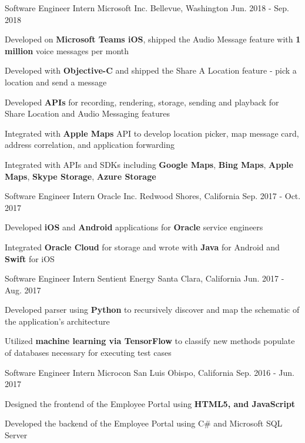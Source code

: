 \begin{cventries}
\cventry
	{Software Engineer Intern}
	{Microsoft Inc.}
	{Bellevue, Washington}
	{Jun. 2018 - Sep. 2018}
{								
	\begin{cvitems}
        \item {Developed on \textbf{Microsoft Teams iOS}, shipped the Audio Message feature with \textbf{1 million} voice messages per month}
        \item {Developed with \textbf{Objective-C} and shipped the Share A Location feature - pick a location and send a message}
        \item {Developed \textbf{APIs} for recording, rendering, storage, sending and playback for Share Location and Audio Messaging features}
        \item {Integrated with \textbf{Apple Maps} API to develop location picker, map message card, address correlation, and application forwarding}
        \item {Integrated with APIs and SDKs including \textbf{Google Maps}, \textbf{Bing Maps}, \textbf{Apple Maps}, \textbf{Skype Storage}, \textbf{Azure Storage}}
	\end{cvitems}
}

\cventry
{Software Engineer Intern}
{Oracle Inc.}
{Redwood Shores, California}
{Sep. 2017 - Oct. 2017}
{
\begin{cvitems}
\item {Developed \textbf{iOS} and \textbf{Android} applications for \textbf{Oracle} service engineers}
\item {Integrated \textbf{Oracle Cloud} for storage and wrote with \textbf{Java} for Android and \textbf{Swift} for iOS}
\end{cvitems}
}

\cventry
{Software Engineer Intern} %
{Sentient Energy} %
{Santa Clara, California} %
{Jun. 2017 - Aug. 2017} %
{ %
\begin{cvitems}
\item {Developed parser using \textbf{Python} to recursively discover and map the schematic of the application's architecture}
\item {Utilized \textbf{machine learning via TensorFlow} to classify new methods populate of databases necessary for executing test cases}
\end{cvitems}
}


\cventry
{Software Engineer Intern} %
{Microcon} %
{San Luis Obispo, California} %
{Sep. 2016 - Jun. 2017} %
{ %
\begin{cvitems}
\item {Designed the frontend of the Employee Portal using \textbf{HTML5, and JavaScript}}
\item {Developed the backend of the Employee Portal using C\# and Microsoft SQL Server}
\end{cvitems}
}


\end{cventries}
